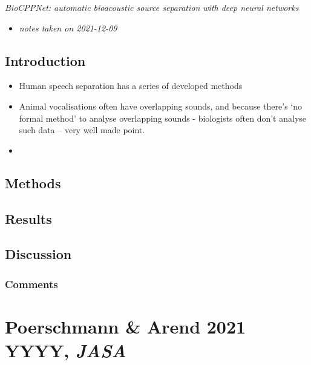 \documentclass[
]{book}
\providecommand{\tightlist}{%
  \setlength{\itemsep}{0pt}\setlength{\parskip}{0pt}}
\begin{document}

\emph{BioCPPNet: automatic bioacoustic source separation with deep neural networks} \citep{bermant_biocppnet_2021}

\begin{itemize}
\tightlist
\item
  \emph{notes taken on 2021-12-09}
\end{itemize}

\hypertarget{introduction-15}{%
\section{Introduction}\label{introduction-15}}

\begin{itemize}
\tightlist
\item
  Human speech separation has a series of developed methods
\item
  Animal vocalisations often have overlapping sounds, and because there's `no formal method' to analyse overlapping sounds - biologists often don't analyse such data -- very well made point.
\item
\end{itemize}

\hypertarget{methods-14}{%
\section{Methods}\label{methods-14}}

\hypertarget{results-14}{%
\section{Results}\label{results-14}}

\hypertarget{discussion-9}{%
\section{Discussion}\label{discussion-9}}

\hypertarget{comments-13}{%
\subsection{Comments}\label{comments-13}}

\hypertarget{poerschmann-arend-2021-yyyy-jasa}{%
\chapter{\texorpdfstring{Poerschmann \& Arend 2021 YYYY, \emph{JASA}}{Poerschmann \& Arend 2021 YYYY, JASA}}\label{poerschmann-arend-2021-yyyy-jasa}}
\end{document}
